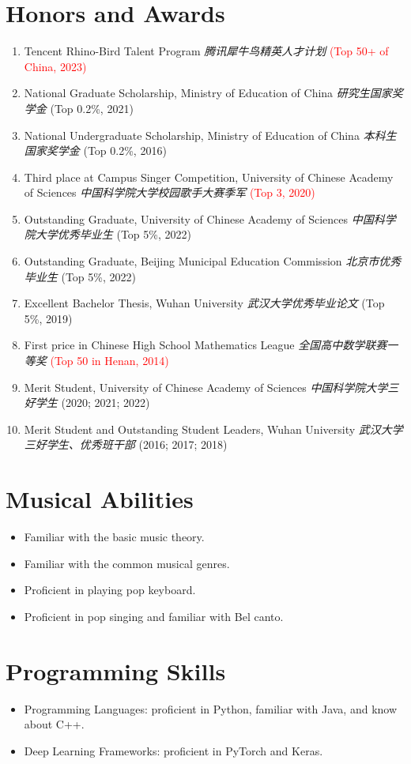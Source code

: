 \documentclass{resume}
\begin{document}
\section{Honors and Awards}
\begin{enumerate}
  \item Tencent Rhino-Bird Talent Program \textit{腾讯犀牛鸟精英人才计划} \textcolor{red}{(Top 50+ of China, 2023)}
  \item National Graduate Scholarship, Ministry of Education of China \textit{研究生国家奖学金}
        (Top 0.2\%, 2021)
  \item National Undergraduate Scholarship, Ministry of Education of China
        \textit{本科生国家奖学金} (Top 0.2\%, 2016)
  \item Third place at Campus Singer Competition, University of Chinese Academy of
        Sciences \textit{中国科学院大学校园歌手大赛季军} \textcolor{red}{(Top 3, 2020)}
  \item Outstanding Graduate, University of Chinese Academy of Sciences
        \textit{中国科学院大学优秀毕业生} (Top 5\%, 2022)
  \item Outstanding Graduate, Beijing Municipal Education Commission \textit{北京市优秀毕业生}
        (Top 5\%, 2022)
  \item Excellent Bachelor Thesis, Wuhan University \textit{武汉大学优秀毕业论文} (Top 5\%, 2019)
  \item First price in Chinese High School Mathematics League \textit{全国高中数学联赛一等奖} \textcolor{red}{(Top
        50 in Henan, 2014)}
  \item Merit Student, University of Chinese Academy of Sciences \textit{中国科学院大学三好学生}
        (2020; 2021; 2022)
  \item Merit Student and Outstanding Student Leaders, Wuhan University
        \textit{武汉大学三好学生、优秀班干部} (2016; 2017; 2018)
\end{enumerate}

\section{Musical Abilities}
\begin{itemize}
  \item Familiar with the basic music theory.
  \item Familiar with the common musical genres.
  \item Proficient in playing pop keyboard.
  \item Proficient in pop singing and familiar with Bel canto.
\end{itemize}

\section{Programming Skills}
\begin{itemize}
  \item Programming Languages: proficient in Python, familiar with Java, and know about
        C++.
  \item Deep Learning Frameworks: proficient in PyTorch and Keras.
\end{itemize}
\end{document}
